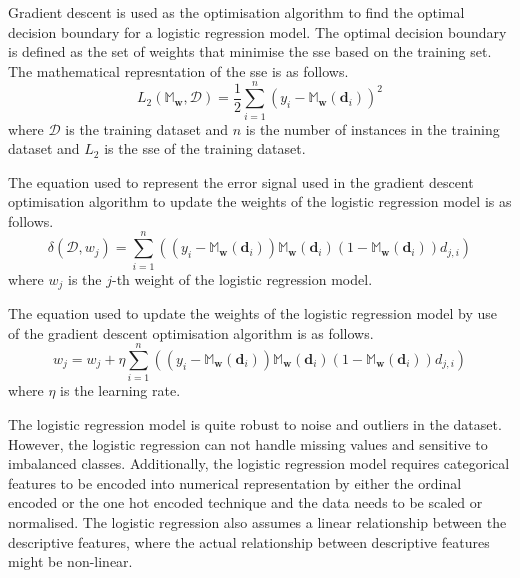 \documentclass[10pt, conference]{IEEEtran}
\begin{document}
Gradient descent is used as the optimisation algorithm to find the optimal decision boundary for a logistic regression model.
The optimal decision boundary is defined as the set of weights that minimise the \acrfull{sse} based on the training set.
The mathematical represntation of the \acrshort{sse} is as follows.
\begin{equation}
    L_2\left(\mathbb{M}_{\textbf{w}}, \mathcal{D}\right) = \frac{1}{2} \sum_{i=1}^{n} \left( y_i - \mathbb{M}_{\textbf{w}}(\textbf{d}_i) \right)^2 \label{eq: sse_function}
\end{equation}
where $\mathcal{D}$ is the training dataset and $n$ is the number of instances in the training dataset and $L_2$ is the
\acrshort{sse} of the training dataset.

The equation used to represent the error signal used in the gradient descent optimisation algorithm to update the weights
of the logistic regression model is as follows.
\begin{equation}
    \delta(\mathcal{D}, w_j) = \sum_{i=1}^{n} \left((y_i - \mathbb{M}_{\textbf{w}}(\textbf{d}_i)) \mathbb{M}_{\textbf{w}}(\textbf{d}_i)
                                    (1-\mathbb{M}_{\textbf{w}}(\textbf{d}_i)) d_{j,i}\right) \label{eq: error_signal}
\end{equation}
where $w_j$ is the $j$-th weight of the logistic regression model.

The equation used to update the weights of the logistic regression model by use of the gradient descent optimisation algorithm
is as follows.
\begin{equation}
    w_j = w_j + \eta \sum_{i=1}^{n} \left((y_i - \mathbb{M}_{\textbf{w}}(\textbf{d}_i)) \mathbb{M}_{\textbf{w}}(\textbf{d}_i)
                            (1-\mathbb{M}_{\textbf{w}}(\textbf{d}_i)) d_{j,i}\right) \label{eq: weight_update}
\end{equation}
where $\eta$ is the learning rate.

The logistic regression model is quite robust to noise and outliers in the dataset. However, the logistic
regression can not handle missing values and sensitive to imbalanced classes. Additionally, the logistic
regression model requires categorical features to be encoded into numerical representation by either the
ordinal encoded or the one hot encoded technique and the data needs to be scaled or normalised. The logistic
regression also assumes a linear relationship between the descriptive features, where the actual relationship
between descriptive features might be non-linear.
\end{document}

